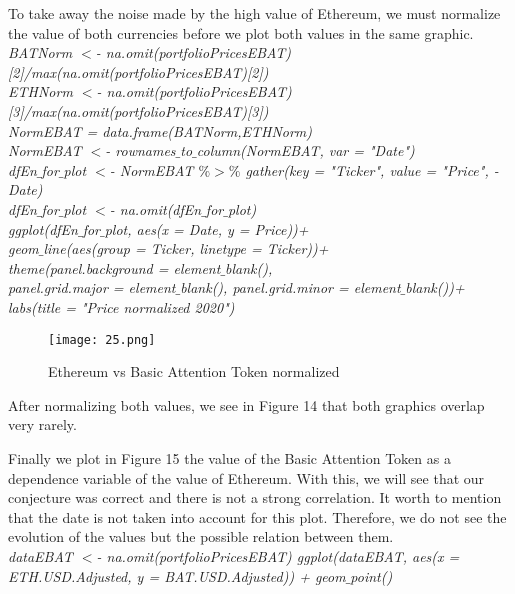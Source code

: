 \documentclass[14pt]{amsart}
\begin{document}
To take away the noise made by the high value of Ethereum, we must normalize the value of both currencies before we plot both values in the same graphic.\\

\noindent \textit{BATNorm $<$- na.omit(portfolioPricesEBAT)[2]/max(na.omit(portfolioPricesEBAT)[2])}\\
\noindent \textit{ETHNorm $<$- na.omit(portfolioPricesEBAT)[3]/max(na.omit(portfolioPricesEBAT)[3])}\\
\noindent \textit{NormEBAT = data.frame(BATNorm,ETHNorm)}\\

\noindent \textit{NormEBAT $<$- rownames$\_$to$\_$column(NormEBAT, var = "Date")}\\
\noindent \textit{dfEn$\_$for$\_$plot $<$- NormEBAT $\%>\%$ gather(key = "Ticker", value = "Price", -Date)}\\
\noindent \textit{dfEn$\_$for$\_$plot $<$- na.omit(dfEn$\_$for$\_$plot)}\\

\noindent \textit{ggplot(dfEn$\_$for$\_$plot, aes(x = Date, y = Price))+}\\
\indent \textit{geom$\_$line(aes(group = Ticker, linetype = Ticker))+}\\
\indent \textit{theme(panel.background =  element$\_$blank(),}\\
\indent \textit{panel.grid.major = element$\_$blank(), panel.grid.minor = element$\_$blank())+}\\
\indent \textit{labs(title = "Price normalized 2020")}

\begin{figure}[h!]
  \texttt{[image: 25.png]}
  \caption{Ethereum vs Basic Attention Token normalized}
  \label{fig:boat1}
\end{figure}

After normalizing both values, we see in Figure 14 that both graphics overlap very rarely.

Finally we plot in Figure 15 the value of the Basic Attention Token as a dependence variable of the value of Ethereum. With this, we will see that our conjecture was correct and there is not a strong correlation. It worth to mention that the date is not taken into account for this plot. Therefore, we do not see the evolution of the values but the possible relation between them.\\

\noindent \textit{dataEBAT $<$- na.omit(portfolioPricesEBAT) ggplot(dataEBAT, aes(x = ETH.USD.Adjusted, y = BAT.USD.Adjusted)) + geom$\_$point()}
\end{document}
